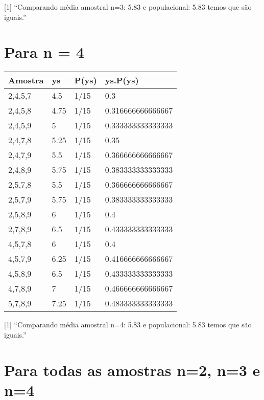 \documentclass[]{article}
\begin{document}
{[}1{]} ``Comparando média amostral n=3: 5.83 e populacional: 5.83 temos
que são iguais.''

\section{Para n = 4}\label{para-n-4}

\begin{longtable}[]{@{}llll@{}}
\toprule
Amostra & ys & P(ys) & ys.P(ys)\tabularnewline
\midrule
\endhead
2,4,5,7 & 4.5 & 1/15 & 0.3\tabularnewline
2,4,5,8 & 4.75 & 1/15 & 0.316666666666667\tabularnewline
2,4,5,9 & 5 & 1/15 & 0.333333333333333\tabularnewline
2,4,7,8 & 5.25 & 1/15 & 0.35\tabularnewline
2,4,7,9 & 5.5 & 1/15 & 0.366666666666667\tabularnewline
2,4,8,9 & 5.75 & 1/15 & 0.383333333333333\tabularnewline
2,5,7,8 & 5.5 & 1/15 & 0.366666666666667\tabularnewline
2,5,7,9 & 5.75 & 1/15 & 0.383333333333333\tabularnewline
2,5,8,9 & 6 & 1/15 & 0.4\tabularnewline
2,7,8,9 & 6.5 & 1/15 & 0.433333333333333\tabularnewline
4,5,7,8 & 6 & 1/15 & 0.4\tabularnewline
4,5,7,9 & 6.25 & 1/15 & 0.416666666666667\tabularnewline
4,5,8,9 & 6.5 & 1/15 & 0.433333333333333\tabularnewline
4,7,8,9 & 7 & 1/15 & 0.466666666666667\tabularnewline
5,7,8,9 & 7.25 & 1/15 & 0.483333333333333\tabularnewline
\bottomrule
\end{longtable}

{[}1{]} ``Comparando média amostral n=4: 5.83 e populacional: 5.83 temos
que são iguais.''

\section{Para todas as amostras n=2, n=3 e
n=4}\label{para-todas-as-amostras-n2-n3-e-n4}
\end{document}
